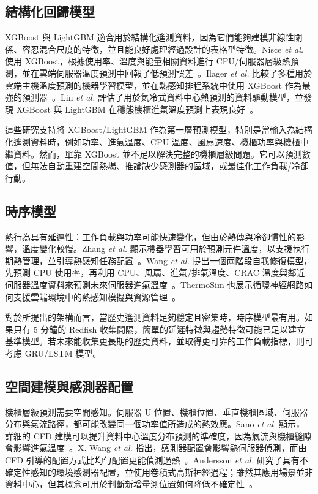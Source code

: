 \documentclass[12pt,a4paper]{article}
\newcommand{\etal}{\textit{et al.}}
\begin{document}
\subsection{結構化回歸模型}

XGBoost 與 LightGBM 適合用於結構化遙測資料，因為它們能夠建模非線性關係、容忍混合尺度的特徵，並且能良好處理經過設計的表格型特徵。Nisce \etal{} 使用 XGBoost，根據使用率、溫度與能量相關資料進行 CPU/伺服器層級熱預測，並在雲端伺服器溫度預測中回報了低預測誤差~\cite{nisce_2023}。Ilager \etal{} 比較了多種用於雲端主機溫度預測的機器學習模型，並在熱感知排程系統中使用 XGBoost 作為最強的預測器~\cite{ilager_2021}。Lin \etal{} 評估了用於氣冷式資料中心熱預測的資料驅動模型，並發現 XGBoost 與 LightGBM 在穩態機櫃進氣溫度預測上表現良好~\cite{lin_ate_2022}。

這些研究支持將 XGBoost/LightGBM 作為第一層預測模型，特別是當輸入為結構化遙測資料時，例如功率、進氣溫度、CPU 溫度、風扇速度、機櫃功率與機櫃中繼資料。然而，單靠 XGBoost 並不足以解決完整的機櫃層級問題。它可以預測數值，但無法自動重建空間熱場、推論缺少感測器的區域，或最佳化工作負載/冷卻行動。

\subsection{時序模型}

熱行為具有延遲性：工作負載與功率可能快速變化，但由於熱傳與冷卻慣性的影響，溫度變化較慢。Zhang \etal{} 顯示機器學習可用於預測元件溫度，以支援執行期熱管理，並引導熱感知任務配置~\cite{zhang_2018}。Wang \etal{} 提出一個兩階段自我修復模型，先預測 CPU 使用率，再利用 CPU、風扇、進氣/排氣溫度、CRAC 溫度與鄰近伺服器溫度資料來預測未來伺服器進氣溫度~\cite{wang_self_healing_2024}。ThermoSim 也展示循環神經網路如何支援雲端環境中的熱感知模擬與資源管理~\cite{gill_thermosim_2020}。

對於所提出的架構而言，當歷史遙測資料足夠穩定且密集時，時序模型最有用。如果只有 5 分鐘的 Redfish 收集間隔，簡單的延遲特徵與趨勢特徵可能已足以建立基準模型。若未來能收集更長期的歷史資料，並取得更可靠的工作負載指標，則可考慮 GRU/LSTM 模型。

\subsection{空間建模與感測器配置}

機櫃層級預測需要空間感知。伺服器 U 位置、機櫃位置、垂直機櫃區域、伺服器分布與氣流路徑，都可能改變同一個功率值所造成的熱效應。Sano \etal{} 顯示，詳細的 CFD 建模可以提升資料中心溫度分布預測的準確度，因為氣流與機櫃縫隙會影響進氣溫度~\cite{sano_2018}。X. Wang \etal{} 指出，感測器配置會影響熱伺服器偵測，而由 CFD 引導的配置方式比均勻配置更能偵測過熱~\cite{xwang_sensor_2013}。Andersson \etal{} 研究了具有不確定性感知的環境感測器配置，並使用卷積式高斯神經過程；雖然其應用場景並非資料中心，但其概念可用於判斷新增量測位置如何降低不確定性~\cite{andersson_2023}。
\end{document}
